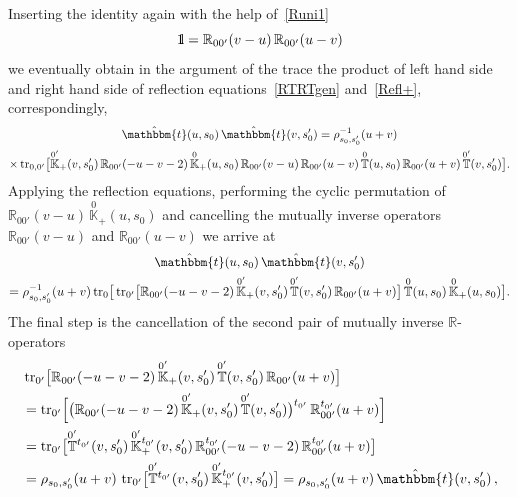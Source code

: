\documentclass[a4paper,11pt]{article}
\newcommand{\tr}{\mathop{\rm tr}\nolimits}
\def\II{\hbox{{1}\kern-.25em\hbox{l}}}
\numberwithin{equation}{section}
\begin{document}
Inserting the identity again with the help of~\eqref{Runi1}
\begin{equation}
	\II = 
	\mathbb{R}_{00'}(v-u)\,\mathbb{R}_{00'}(u-v)
\end{equation}
we eventually obtain in the argument of the trace the product of left hand side and right hand side of reflection equations~\eqref{RTRTgen} and~\eqref{Refl+}, correspondingly,
\begin{multline} \nonumber
	\hat{\mathbbm{t}}(u,s_0)\,\hat{\mathbbm{t}}(v,s_0') = \rho_{s_0,s_0'}^{-1}(u+v)  \\
	\times
	\tr_{0,0'}\bigl[
	\overset{0'}{\mathbb{K}}{}_+(v,s_0')\,\mathbb{R}_{00'}(-u-v-2)\,\overset{0}{\mathbb{K}}_+(u,s_0) \,
	\mathbb{R}_{00'}(v-u)\,\mathbb{R}_{00'}(u-v)\,
	\overset{0}{\mathbb{T}}(u,s_0)\,\mathbb{R}_{00'}(u+v)\,\overset{0'}{\mathbb{T}}(v,s_0')
	\bigr] .
\end{multline}
Applying the reflection equations, performing the cyclic permutation of $\mathbb{R}_{00'}(v-u)\,\overset{0}{\mathbb{K}}_+(u,s_0)$ and cancelling the mutually inverse operators $\mathbb{R}_{00'}(v-u)$ and $\mathbb{R}_{00'}(u-v)$ we arrive at
\begin{multline} \nonumber
	\hat{\mathbbm{t}}(u,s_0)\,\hat{\mathbbm{t}}(v,s_0') \\
	= \rho_{s_0,s_0'}^{-1}(u+v)
	\tr_{0}\bigl[ \,
	\tr_{0'}\bigl[
	\mathbb{R}_{00'}(-u-v-2)\,\overset{0'}{\mathbb{K}}{}_+(v,s_0') \,	\overset{0'}{\mathbb{T}}(v,s_0')  \, \mathbb{R}_{00'}(u+v) \bigr] \,
	\overset{0}{\mathbb{T}}(u,s_0)\,\overset{0}{\mathbb{K}}_+(u,s_0)
	\bigr] .
\end{multline}
The final step is the cancellation of the second pair of mutually inverse $\mathbb{R}$-operators
\begin{align*}
	&
	\tr_{0'}\bigl[
	\mathbb{R}_{00'}(-u-v-2)\,\overset{0'}{\mathbb{K}}{}_+(v,s_0') \,	\overset{0'}{\mathbb{T}}(v,s_0')  \, \mathbb{R}_{00'}(u+v) \bigr] \\
	& =
	\tr_{0'}\Bigl[
	\bigl(\mathbb{R}_{00'}(-u-v-2)\,\overset{0'}{\mathbb{K}}{}_+(v,s_0') \,	\overset{0'}{\mathbb{T}}(v,s_0')\bigr)^{t_{0'}}  \, \mathbb{R}_{00'}^{t_{0'}}(u+v) \Bigr] \\
	& =
	\tr_{0'}\bigl[
	\overset{0'}{\mathbb{T}}{}^{t_{0'}}(v,s_0') \,
	\overset{0'}{\mathbb{K}}{}_+^{t_{0'}}(v,s_0') \, \mathbb{R}_{00'}^{t_{0'}}(-u-v-2) \, \mathbb{R}_{00'}^{t_{0'}}(u+v) \bigr] \\
	& =
	\rho_{s_0,s_0'}(u+v) \,
	\tr_{0'}\bigl[
	\overset{0'}{\mathbb{T}}{}^{t_{0'}}(v,s_0') \,
	\overset{0'}{\mathbb{K}}{}_+^{t_{0'}}(v,s_0') \bigr]
	= \rho_{s_0,s_0'}(u+v)\,\hat{\mathbbm{t}}(v,s_0') \,,
\end{align*}
\end{document}
